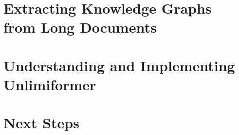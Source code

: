\documentclass[12pt]{article}
\begin{document}

%
\section{Extracting Knowledge Graphs from Long Documents}



\section{Understanding and Implementing Unlimiformer}

\section{Next Steps}

\newpage
\printbibliography
\appendix
\newpage

\newpage

\newpage

\newpage
\end{document}
